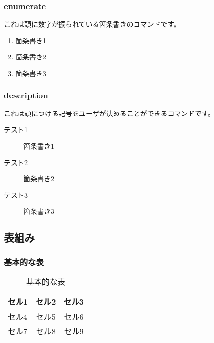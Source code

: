 \documentclass[12pt, b5paper]{ltjsarticle}
\begin{document}
            \subsubsection{enumerate}
                これは頭に数字が振られている箇条書きのコマンドです。
                \begin{enumerate}
                    \item 箇条書き1
                    \item 箇条書き2
                    \item 箇条書き3
                \end{enumerate}
            \subsubsection{description}
                これは頭につける記号をユーザが決めることができるコマンドです。
                \begin{description}
                    \item[テスト1] 箇条書き1
                    \item[テスト2] 箇条書き2
                    \item[テスト3] 箇条書き3
                \end{description}
        \subsection{表組み}
            \subsubsection{基本的な表}
                \begin{table}[H]
                    \begin{center}
                    \caption{基本的な表}
                    \begin{tabular}{|l|c|r|}
                        \hline
                        セル1 & セル2 & セル3 \\ \hline
                        セル4 & セル5 & セル6 \\ \hline
                        セル7 & セル8 & セル9 \\ \hline
                    \end{tabular} 
                    \end{center}
                \end{table}
\end{document}
